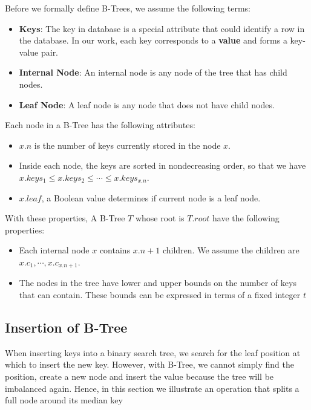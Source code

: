 Before we formally define B-Trees, we assume the following terms:

\begin{itemize}
\item
  \textbf{Keys}: The key in database is a special attribute that could
  identify a row in the database. In our work, each key corresponds to a
  \textbf{value} and forms a key-value pair.
\item
  \textbf{Internal Node}: An internal node is any node of the tree that
  has child nodes.
\item
  \textbf{Leaf Node}: A leaf node is any node that does not have child
  nodes.
\end{itemize}

Each node in a B-Tree has the following attributes:

\begin{itemize}
\item
  \(x.n\) is the number of keys currently stored in the node \(x\).
\item
  Inside each node, the keys are sorted in nondecreasing order, so that
  we have \(x.keys_1\leq x.keys_2\leq\cdots\leq x.keys_{x.n}\).
\item
  \(x.leaf\), a Boolean value determines if current node is a leaf node.
\end{itemize}

With these properties, A B-Tree \(T\) whose root is \(T.root\) have the
following properties:

\begin{itemize}
\item
  Each internal node \(x\) contains \(x.n+1\) children. We assume the
  children are \(x.c_1,\cdots,x.c_{x.n+1}\).
\item
  The nodes in the tree have lower and upper bounds on the number of
  keys that can contain. These bounds can be expressed in terms of a
  fixed integer \(t\)
\end{itemize}

\subsection{Insertion of B-Tree}

When inserting keys into a binary search tree, we search for the leaf
position at which to insert the new key. However, with B-Tree, we cannot
simply find the position, create a new node and insert the value because
the tree will be imbalanced again. Hence, in this section we illustrate
an operation that splits a full node around its median key

